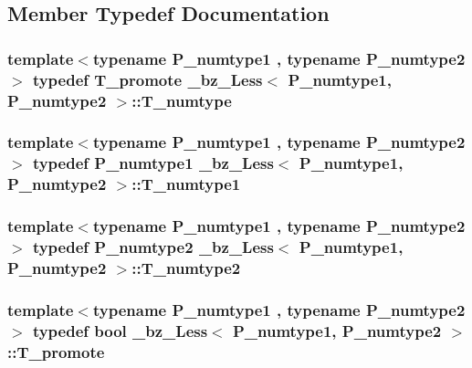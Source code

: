 \subsection{Member Typedef Documentation}
\hypertarget{class__bz__Less_ae82c5dcb612b5cfef859791956670bd8}{}
\subsubsection[{T\+\_\+numtype}]{\setlength{\rightskip}{0pt plus 5cm}template$<$typename P\+\_\+numtype1 , typename P\+\_\+numtype2 $>$ typedef {\bf T\+\_\+promote} {\bf \+\_\+bz\+\_\+\+Less}$<$ P\+\_\+numtype1, P\+\_\+numtype2 $>$\+::{\bf T\+\_\+numtype}}\label{class__bz__Less_ae82c5dcb612b5cfef859791956670bd8}
\hypertarget{class__bz__Less_ab67f34fd1451c9ab3e0492d9e9dc775c}{}
\subsubsection[{T\+\_\+numtype1}]{\setlength{\rightskip}{0pt plus 5cm}template$<$typename P\+\_\+numtype1 , typename P\+\_\+numtype2 $>$ typedef P\+\_\+numtype1 {\bf \+\_\+bz\+\_\+\+Less}$<$ P\+\_\+numtype1, P\+\_\+numtype2 $>$\+::{\bf T\+\_\+numtype1}}\label{class__bz__Less_ab67f34fd1451c9ab3e0492d9e9dc775c}
\hypertarget{class__bz__Less_a1937c0334894d4bc6f0a4444c2ac8218}{}
\subsubsection[{T\+\_\+numtype2}]{\setlength{\rightskip}{0pt plus 5cm}template$<$typename P\+\_\+numtype1 , typename P\+\_\+numtype2 $>$ typedef P\+\_\+numtype2 {\bf \+\_\+bz\+\_\+\+Less}$<$ P\+\_\+numtype1, P\+\_\+numtype2 $>$\+::{\bf T\+\_\+numtype2}}\label{class__bz__Less_a1937c0334894d4bc6f0a4444c2ac8218}
\hypertarget{class__bz__Less_a12a8fd0293fd7172cdfb8607b7218125}{}
\subsubsection[{T\+\_\+promote}]{\setlength{\rightskip}{0pt plus 5cm}template$<$typename P\+\_\+numtype1 , typename P\+\_\+numtype2 $>$ typedef {\bf bool} {\bf \+\_\+bz\+\_\+\+Less}$<$ P\+\_\+numtype1, P\+\_\+numtype2 $>$\+::{\bf T\+\_\+promote}}\label{class__bz__Less_a12a8fd0293fd7172cdfb8607b7218125}


